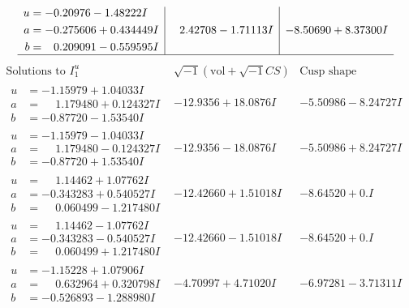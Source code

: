\documentclass[1p]{elsarticle_modified}
\theoremstyle{definition}
\newcommand{\I}{\sqrt{-1}}
\begin{document}
$$\begin{array}{c|c|c}
\begin{aligned}
u &= -0.20976 - 1.48222 I \\
a &= -0.275606 + 0.434449 I \\
b &= \phantom{-}0.209091 - 0.559595 I\end{aligned}
 & \phantom{-}2.42708 - 1.71113 I & -8.50690 + 8.37300 I\\
 \hline 
 \end{array}$$\newpage$$\begin{array}{c|c|c}  
\text{Solutions to }I^u_{1}& \I (\text{vol} + \sqrt{-1}CS) & \text{Cusp shape}\\
 \hline 
\begin{aligned}
u &= -1.15979 + 1.04033 I \\
a &= \phantom{-}1.179480 + 0.124327 I \\
b &= -0.87720 - 1.53540 I\end{aligned}
 & -12.9356 + 18.0876 I & -5.50986 - 8.24727 I \\ \hline\begin{aligned}
u &= -1.15979 - 1.04033 I \\
a &= \phantom{-}1.179480 - 0.124327 I \\
b &= -0.87720 + 1.53540 I\end{aligned}
 & -12.9356 - 18.0876 I & -5.50986 + 8.24727 I \\ \hline\begin{aligned}
u &= \phantom{-}1.14462 + 1.07762 I \\
a &= -0.343283 + 0.540527 I \\
b &= \phantom{-}0.060499 - 1.217480 I\end{aligned}
 & -12.42660 + 1.51018 I & -8.64520 + 0. I\phantom{ +0.000000I} \\ \hline\begin{aligned}
u &= \phantom{-}1.14462 - 1.07762 I \\
a &= -0.343283 - 0.540527 I \\
b &= \phantom{-}0.060499 + 1.217480 I\end{aligned}
 & -12.42660 - 1.51018 I & -8.64520 + 0. I\phantom{ +0.000000I} \\ \hline\begin{aligned}
u &= -1.15228 + 1.07906 I \\
a &= \phantom{-}0.632964 + 0.320798 I \\
b &= -0.526893 - 1.288980 I\end{aligned}
 & -4.70997 + 4.71020 I & -6.97281 - 3.71311 I \\ \hline\begin{aligned}

\end{aligned}
\end{array}$$
\end{document}
